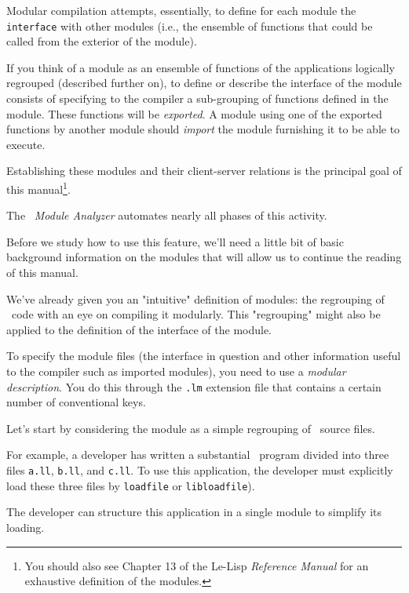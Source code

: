 
Modular compilation attempts, essentially, to define for each module the {\tt interface} with other modules (i.e., the ensemble of functions that could be called from the exterior of the module).

If you think of a module as an ensemble of functions of the applications logically regrouped (described further on), to define or describe the interface of the module consists of specifying to the compiler a sub-grouping of functions defined in the module.  These functions will be {\em exported}.
A module using one of the exported functions by another module should {\em import} the module furnishing it to be able to execute.

Establishing these modules and their client-server relations is the principal goal of this manual\footnote{ You should also see Chapter 13 of the Le-Lisp {\em Reference Manual} for an exhaustive definition of the modules.}.

The \LeLisp\
{\em Module Analyzer} automates nearly all phases of this activity.

Before we study how to use this feature, we'll need a little bit of 
basic background information on the modules that will allow us to continue the reading of this manual. 


We've already given you an "intuitive" definition of modules:  the regrouping of \LeLisp\ code with an eye on compiling it modularly.
This "regrouping" might also be applied to the definition of the interface of the module. 

To specify the module files (the interface in question and other information useful to the compiler such as imported modules), you need to use a {\em modular description}.  You do this through the {\tt .lm} extension file that contains a certain number of conventional keys.  


Let's start by considering the module as a simple regrouping of
\LeLisp\  source files.

For example, a developer has written a substantial \LeLisp\ program divided into three files {\tt a.ll}, {\tt b.ll}, and {\tt c.ll}.  To use this application, the developer must explicitly load these three files by {\tt loadfile} or {\tt libloadfile}).

The developer can structure this application in a single module to simplify its loading.

